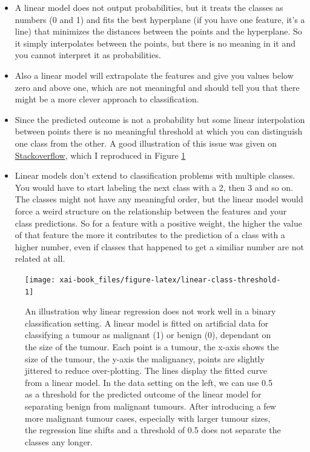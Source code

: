 \documentclass[12pt,]{krantz}
\providecommand{\tightlist}{%
  \setlength{\itemsep}{0pt}\setlength{\parskip}{0pt}}
\theoremstyle{definition}
\theoremstyle{definition}
\theoremstyle{definition}
\theoremstyle{remark}
\begin{document}
\begin{itemize}
\tightlist
\item
  A linear model does not output probabilities, but it treats the
  classes as numbers (0 and 1) and fits the best hyperplane (if you have
  one feature, it's a line) that minimizes the distances between the
  points and the hyperplane. So it simply interpolates between the
  points, but there is no meaning in it and you cannot interpret it as
  probabilities.
\item
  Also a linear model will extrapolate the features and give you values
  below zero and above one, which are not meaningful and should tell you
  that there might be a more clever approach to classification.
\item
  Since the predicted outcome is not a probability but some linear
  interpolation between points there is no meaningful threshold at which
  you can distinguish one class from the other. A good illustration of
  this issue was given on
  \href{https://stats.stackexchange.com/questions/22381/why-not-approach-classification-through-regression}{Stackoverflow},
  which I reproduced in Figure \ref{fig:linear-class-threshold}
\item
  Linear models don't extend to classification problems with multiple
  classes. You would have to start labeling the next class with a 2,
  then 3 and so on. The classes might not have any meaningful order, but
  the linear model would force a weird structure on the relationship
  between the features and your class predictions. So for a feature with
  a positive weight, the higher the value of that feature the more it
  contributes to the prediction of a class with a higher number, even if
  classes that happened to get a similiar number are not related at all.
\end{itemize}

\begin{figure}

{\centering \texttt{[image: xai-book\_files/figure-latex/linear-class-threshold-1]} 

}

\caption{An illustration why linear regression does not work well in a binary classification setting. A linear model is fitted on artificial data for classifying a tumour as malignant (1) or benign (0), dependant on the size of the tumour. Each point is a tumour, the x-axis shows the size of the tumour, the y-axis the malignancy, points are slightly jittered to reduce over-plotting. The lines display the fitted curve from a linear model. In the data setting on the left, we can use 0.5 as a threshold for the predicted outcome of the linear model for separating benign from malignant tumours. After introducing a few more malignant tumour cases, especially with larger tumour sizes, the regression line shifts and a threshold of 0.5 does not separate the classes any longer.}\label{fig:linear-class-threshold}
\end{figure}
\end{document}
